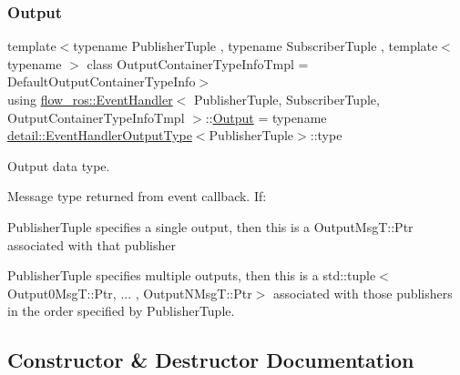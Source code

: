 \subsubsection{\texorpdfstring{Output}{Output}}
{\footnotesize\ttfamily template$<$typename Publisher\+Tuple , typename Subscriber\+Tuple , template$<$ typename $>$ class Output\+Container\+Type\+Info\+Tmpl = Default\+Output\+Container\+Type\+Info$>$ \\
using \hyperlink{classflow__ros_1_1_event_handler}{flow\+\_\+ros\+::\+Event\+Handler}$<$ Publisher\+Tuple, Subscriber\+Tuple, Output\+Container\+Type\+Info\+Tmpl $>$\+::\hyperlink{classflow__ros_1_1_event_handler_ae5dc263e5c12a4b7fb60f320dc403173}{Output} =  typename \hyperlink{structflow__ros_1_1detail_1_1_event_handler_output_type}{detail\+::\+Event\+Handler\+Output\+Type}$<$Publisher\+Tuple$>$\+::type}



Output data type. 

Message type returned from event callback. If\+:
\begin{DoxyItemize}
\item {\ttfamily Publisher\+Tuple} specifies a single output, then this is a {\ttfamily Output\+Msg\+T\+::\+Ptr} associated with that publisher
\end{DoxyItemize}

{\ttfamily Publisher\+Tuple} specifies multiple outputs, then this is a {\ttfamily std\+::tuple$<$\+Output0\+Msg\+T\+::\+Ptr, ... , Output\+N\+Msg\+T\+::\+Ptr$>$} associated with those publishers in the order specified by {\ttfamily Publisher\+Tuple}. 

\subsection{Constructor \& Destructor Documentation}
\mbox{\label{classflow__ros_1_1_event_handler_a24c8067f4faeef500cd4475b6cdfc33e}} 
